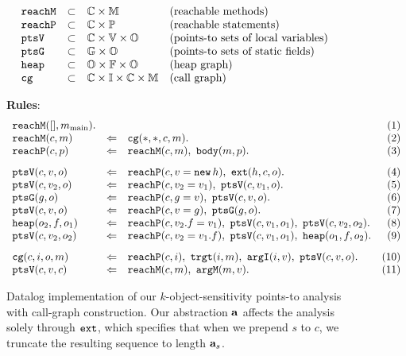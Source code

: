 \begin{figure*}
\begin{minipage}{3.7in}
\[\begin{array}{lcll}
\text{\tt reachM}   &\subset& {\mathbb C} \times {\mathbb M} & \text{(reachable methods)} \\
\text{\tt reachP}   &\subset& {\mathbb C} \times {\mathbb P} & \text{(reachable statements)} \\
\text{\tt ptsV}     &\subset& {\mathbb C} \times {\mathbb V} \times {\mathbb O} & \text{(points-to sets of local variables)} \\
\text{\tt ptsG}     &\subset& {\mathbb G} \times {\mathbb O} & \text{(points-to sets of static fields)} \\
\text{\tt heap}     &\subset& {\mathbb O} \times {\mathbb F} \times {\mathbb O} & \text{(heap graph)} \\
\text{\tt cg}       &\subset& {\mathbb C} \times {\mathbb I} \times {\mathbb C} \times {\mathbb M} & \text{(call graph)}
\end{array}
\]
\end{minipage}
{\bf Rules}: \\
\[
\begin{array}{lclr}
\reachM([],\mmain). &           &  & (1) \\
\reachM(c,m)              &\dlogUpdate& \cg(*,*,c,m). & (2) \\
\reachP(c,p)              &\dlogUpdate& \reachM(c,m),\ \body(m,p). & (3)
\\[8pt]
\ptsV(c,v,o)              &\dlogUpdate& \reachP(c, v = \new\,h),\ \ext(h, c, o). & (4) \\
\ptsV(c,v_2,o)            &\dlogUpdate& \reachP(c, v_2 = v_1),\ \ptsV(c,v_1,o). & (5) \\
\ptsG(g,o)                &\dlogUpdate& \reachP(c, g = v),\ \ptsV(c,v,o). & (6) \\
\ptsV(c,v,o)              &\dlogUpdate& \reachP(c, v = g),\ \ptsG(g,o). & (7) \\
\heap(o_2,f,o_1)          &\dlogUpdate& \reachP(c, v_2.f = v_1),\ \ptsV(c,v_1,o_1),\ \ptsV(c,v_2,o_2). & (8) \\
\ptsV(c,v_2,o_2)          &\dlogUpdate& \reachP(c, v_2 = v_1.f),\ \ptsV(c,v_1,o_1),\ \heap(o_1,f,o_2). & (9)
\\[8pt]
\cg(c,i,o,m)            &\dlogUpdate& \reachP(c,i),\ \trgt(i,m),\ \argI(i,v),\ \ptsV(c,v,o). & (10) \\
\ptsV(c,v,c)             &\dlogUpdate& \reachM(c,m),\ \argM(m,v). & (11)
\end{array}
\]
\caption{Datalog implementation of our $k$-object-sensitivity points-to analysis with call-graph construction.
Our abstraction $\mathbf{a}$ affects the analysis solely through $\text{\tt ext}$,
which specifies that when we prepend $s$ to $c$, we truncate the resulting sequence to length $\mathbf{a}_{s}$.
}
\label{fig:aliasAnalysisRules}
\end{figure*}

